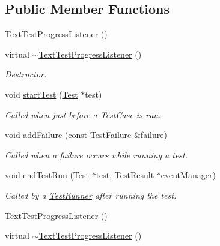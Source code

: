 \subsection*{Public Member Functions}
\begin{DoxyCompactItemize}
\item 
\hyperlink{class_text_test_progress_listener_adf1d555ae326ae414df24decc2d2048f}{Text\+Test\+Progress\+Listener} ()
\item 
\hypertarget{class_text_test_progress_listener_a3bc045e8cf1200215d85c5ca3bbd0f09}{virtual \hyperlink{class_text_test_progress_listener_a3bc045e8cf1200215d85c5ca3bbd0f09}{$\sim$\+Text\+Test\+Progress\+Listener} ()}\label{class_text_test_progress_listener_a3bc045e8cf1200215d85c5ca3bbd0f09}

\begin{DoxyCompactList}\small\item\em Destructor. \end{DoxyCompactList}\item 
\hypertarget{class_text_test_progress_listener_ae5089aa6b0bcae0128604691f23ed224}{void \hyperlink{class_text_test_progress_listener_ae5089aa6b0bcae0128604691f23ed224}{start\+Test} (\hyperlink{class_test}{Test} $\ast$test)}\label{class_text_test_progress_listener_ae5089aa6b0bcae0128604691f23ed224}

\begin{DoxyCompactList}\small\item\em Called when just before a \hyperlink{class_test_case}{Test\+Case} is run. \end{DoxyCompactList}\item 
void \hyperlink{class_text_test_progress_listener_a66f5a921e6e3ceecc8a286df7b60abcf}{add\+Failure} (const \hyperlink{class_test_failure}{Test\+Failure} \&failure)
\begin{DoxyCompactList}\small\item\em Called when a failure occurs while running a test. \end{DoxyCompactList}\item 
void \hyperlink{class_text_test_progress_listener_a12df92f16f1e2b9d571fd064fb7f30bd}{end\+Test\+Run} (\hyperlink{class_test}{Test} $\ast$test, \hyperlink{class_test_result}{Test\+Result} $\ast$event\+Manager)
\begin{DoxyCompactList}\small\item\em Called by a \hyperlink{class_test_runner}{Test\+Runner} after running the test. \end{DoxyCompactList}\item 
\hyperlink{class_text_test_progress_listener_aa63f5f3bc8a8dffef5c3d3e7dcad8355}{Text\+Test\+Progress\+Listener} ()
\item 
\hypertarget{class_text_test_progress_listener_a28e80d641b47e53a73e896cce622a2fe}{virtual \hyperlink{class_text_test_progress_listener_a28e80d641b47e53a73e896cce622a2fe}{$\sim$\+Text\+Test\+Progress\+Listener} ()}\label{class_text_test_progress_listener_a28e80d641b47e53a73e896cce622a2fe}


\end{DoxyCompactItemize}

